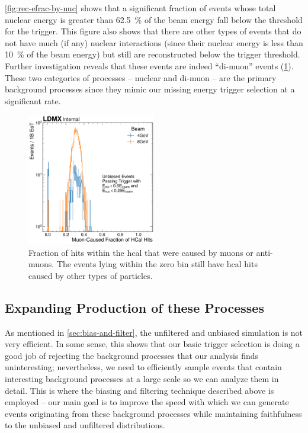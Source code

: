 \cref{fig:rec-efrac-by-nuc} shows that a significant fraction of events whose total nuclear
energy is greater than \qty{62.5}{\percent} of the beam energy fall below the threshold for
the trigger.
This figure also shows that there are other types of events that do not have much (if any)
nuclear interactions (since their nuclear energy is less than \qty{10}{\percent} of the beam
energy) but still are reconstructed below the trigger threshold.
Further investigation reveals that these events are indeed ``di-muon'' events (\cref{fig:dimuon-confirm}).
These two categories of processes -- nuclear and di-muon -- are the primary background
processes since they mimic our missing energy trigger selection at a significant rate.

\begin{figure}
  \centering
  \includegraphics[width=0.5\textwidth]{figures/ldmx/simulation/dimuon-confirmation-hcal-hit-fraction.pdf}
  \caption{Fraction of hits within the \ac{hcal} that were caused by muons or anti-muons.
  The events lying within the zero bin still have \ac{hcal} hits caused by other types of particles.}
  \label{fig:dimuon-confirm}
\end{figure}

\subsection{Expanding Production of these Processes}
As mentioned in \cref{sec:bias-and-filter}, the unfiltered and unbiased simulation is
not very efficient.
In some sense, this shows that our basic trigger selection is doing a good job of
rejecting the background processes that our analysis finds uninteresting;
nevertheless, we need to efficiently sample events that contain interesting background processes
at a large scale so we can analyze them in detail.
This is where the biasing and filtering technique described above is employed --
our main goal is to improve the speed with which we can generate events originating from
these background processes while maintaining faithfulness to the unbiased and unfiltered distributions.

